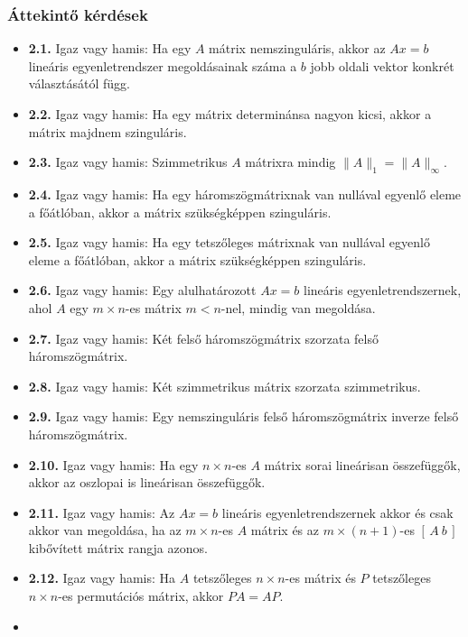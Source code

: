 \documentclass[
  magyar,
  11pt]{article}
\providecommand{\tightlist}{%
  \setlength{\itemsep}{0pt}\setlength{\parskip}{0pt}}
\begin{document}
\subsubsection{Áttekintő
kérdések}\label{uxe1ttekintux151-kuxe9rduxe9sek-1}

\begin{itemize}
\tightlist
\item
  \textbf{2.1.} Igaz vagy hamis: Ha egy \(A\) mátrix nemszinguláris,
  akkor az \(Ax = b\) lineáris egyenletrendszer megoldásainak száma a
  \(b\) jobb oldali vektor konkrét választásától függ.
\item
  \textbf{2.2.} Igaz vagy hamis: Ha egy mátrix determinánsa nagyon
  kicsi, akkor a mátrix majdnem szinguláris.
\item
  \textbf{2.3.} Igaz vagy hamis: Szimmetrikus \(A\) mátrixra mindig
  \(\|A\|_1 = \|A\|_\infty\).
\item
  \textbf{2.4.} Igaz vagy hamis: Ha egy háromszögmátrixnak van nullával
  egyenlő eleme a főátlóban, akkor a mátrix szükségképpen szinguláris.
\item
  \textbf{2.5.} Igaz vagy hamis: Ha egy tetszőleges mátrixnak van
  nullával egyenlő eleme a főátlóban, akkor a mátrix szükségképpen
  szinguláris.
\item
  \textbf{2.6.} Igaz vagy hamis: Egy alulhatározott \(Ax = b\) lineáris
  egyenletrendszernek, ahol \(A\) egy \(m \times n\)-es mátrix
  \(m < n\)-nel, mindig van megoldása.
\item
  \textbf{2.7.} Igaz vagy hamis: Két felső háromszögmátrix szorzata
  felső háromszögmátrix.
\item
  \textbf{2.8.} Igaz vagy hamis: Két szimmetrikus mátrix szorzata
  szimmetrikus.
\item
  \textbf{2.9.} Igaz vagy hamis: Egy nemszinguláris felső
  háromszögmátrix inverze felső háromszögmátrix.
\item
  \textbf{2.10.} Igaz vagy hamis: Ha egy \(n \times n\)-es \(A\) mátrix
  sorai lineárisan összefüggők, akkor az oszlopai is lineárisan
  összefüggők.
\item
  \textbf{2.11.} Igaz vagy hamis: Az \(Ax = b\) lineáris
  egyenletrendszernek akkor és csak akkor van megoldása, ha az
  \(m \times n\)-es \(A\) mátrix és az \(m \times (n+1)\)-es
  \([\,A\ b\,]\) kibővített mátrix rangja azonos.
\item
  \textbf{2.12.} Igaz vagy hamis: Ha \(A\) tetszőleges \(n \times n\)-es
  mátrix és \(P\) tetszőleges \(n \times n\)-es permutációs mátrix,
  akkor \(PA = AP\).
\item

\end{itemize}
\end{document}
